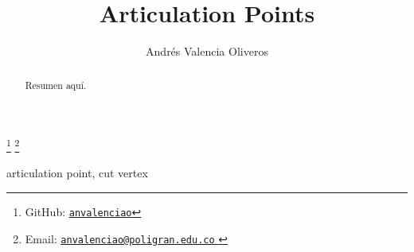 \begin{frontmatter}
	\title{Articulation Points} 
	\author{Andrés Valencia Oliveros}
	\address{Facultad de Ingeniería, Diseño e Innovación\\ 
		Institución Universitaria Politécnico Grancolombiano\\
		Bogotá, Colombia
	}
	\thanks[myGitHub]{GitHub: 
		\href{https://github.com/anvalenciao/ArticulationPoints}{\texttt{anvalenciao}}
	}
	\thanks[myEmail]{Email: 
		\href{mailto:anvalenciao@poligran.edu.co}{
			\texttt{\normalshape anvalenciao@poligran.edu.co}
		}
	}

	\begin{abstract} 
		Resumen aquí.
	\end{abstract}

	\begin{keyword}
		articulation point, cut vertex
	\end{keyword}
\end{frontmatter}